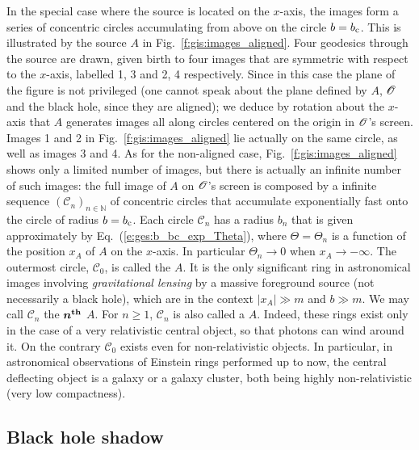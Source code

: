 In the special case where the source is located on the $x$-axis, the images form
a series of concentric circles accumulating from above on the circle
$b = b_{\rm c}$. This is illustrated by the source $A$ in
Fig.~\ref{f:gis:images_aligned}. Four geodesics through the source are drawn,
given birth to four images that
are symmetric with respect to the $x$-axis, labelled 1, 3 and 2, 4 respectively.
Since in this case the plane of the figure is not privileged (one cannot speak
about the plane defined by $A$, $\mathscr{O}$ and the black hole, since they are aligned);
we deduce by rotation about the $x$-axis that $A$ generates images all along
circles centered on the origin in $\mathscr{O}$'s screen. Images 1 and 2 in Fig.~\ref{f:gis:images_aligned}
lie actually on the same circle, as well as images 3 and 4.
As for the non-aligned case, Fig.~\ref{f:gis:images_aligned} shows only a limited number of
images, but there is actually an infinite number of such images: the full image
of $A$ on $\mathscr{O}$'s screen is composed by a infinite sequence $(\mathscr{C}_n)_{n\in\mathbb{N}}$
of concentric circles
that accumulate exponentially fast onto the circle of radius $b = b_{\rm c}$.
Each circle $\mathscr{C}_n$ has a radius $b_n$ that is given approximately
by Eq.~(\ref{e:ges:b_bc_exp_Theta}), where $\Theta = \Theta_n$ is a function of
the position $x_A$ of $A$ on the $x$-axis. In particular $\Theta_n\to 0$
when $x_A\to -\infty$.
The outermost circle, $\mathscr{C}_0$, is called the
 $A$.
It is the only significant ring in astronomical images involving \emph{gravitational
lensing} by a massive foreground source (not necessarily
a black hole), which are in the context $|x_A|\gg m$ and $b\gg m$.
We may call $\mathscr{C}_n$ the $\bm{n^{\rm th}}$ $A$.
For $n\geq 1$, $\mathscr{C}_n$ is also called a 
$A$. Indeed, these rings exist only in the case of a very relativistic central object, so that
photons can wind around it. On the contrary $\mathscr{C}_0$ exists even for non-relativistic
objects. In particular, in astronomical observations of Einstein rings performed up
to now, the central deflecting object is a galaxy or a galaxy cluster,
both being highly non-relativistic (very low compactness).

\subsection{Black hole shadow}

